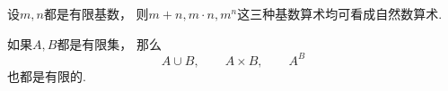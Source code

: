 \begin{theorem}
设\(m,n\)都是有限基数，
则\(
	m + n,
	m \cdot n,
	m^n
\)这三种基数算术均可看成自然数算术.
\end{theorem}

\begin{theorem}
如果\(A,B\)都是有限集，
那么\begin{equation*}
	A \cup B, \qquad
	A \times B, \qquad
	A^B
\end{equation*}也都是有限的.
\end{theorem}
